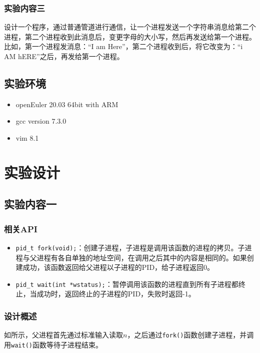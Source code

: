 \documentclass[lang=cn,11pt,a4paper,cite=authornum]{paper}
\begin{document}
\subsubsection{实验内容三}

设计一个程序，通过普通管道进行通信，让一个进程发送一个字符串消息给第二个进程，第二个进程收到此消息后，变更字母的大小写，然后再发送给第一个进程。比如，第一个进程发消息：“I am Here”，第二个进程收到后，将它改变为：“i AM hERE”之后，再发给第一个进程。

\subsection{实验环境}

\begin{itemize}
    \item openEuler 20.03 64bit with ARM
    \item gcc version 7.3.0
    \item vim 8.1
\end{itemize}

\section{实验设计}

\subsection{实验内容一}

\subsubsection{相关API}

\begin{itemize}
    \item \texttt{pid_t fork(void);}：创建子进程，子进程是调用该函数的进程的拷贝。子进程与父进程有各自单独的地址空间，在调用之后其中的内容是相同的。如果创建成功，该函数返回给父进程以子进程的PID，给子进程返回0。
    \item \texttt{pid_t wait(int *wstatus);}：暂停调用该函数的进程直到所有子进程都终止，当成功时，返回终止的子进程的PID，失败时返回-1。 
\end{itemize}

\subsubsection{设计概述}

如所示，父进程首先通过标准输入读取$n$，之后通过\texttt{fork()}函数创建子进程，并调用\texttt{wait()}函数等待子进程结束。
\end{document}

